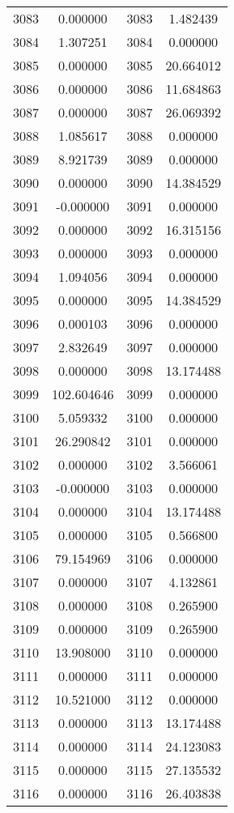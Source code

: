 \documentclass[12pt]{article}
\begin{document}
\begin{longtable}{@{}cccc@{}}
3083 & 0.000000 & 3083 & 1.482439 \\
3084 & 1.307251 & 3084 & 0.000000 \\
3085 & 0.000000 & 3085 & 20.664012 \\
3086 & 0.000000 & 3086 & 11.684863 \\
3087 & 0.000000 & 3087 & 26.069392 \\
3088 & 1.085617 & 3088 & 0.000000 \\
3089 & 8.921739 & 3089 & 0.000000 \\
3090 & 0.000000 & 3090 & 14.384529 \\
3091 & -0.000000 & 3091 & 0.000000 \\
3092 & 0.000000 & 3092 & 16.315156 \\
3093 & 0.000000 & 3093 & 0.000000 \\
3094 & 1.094056 & 3094 & 0.000000 \\
3095 & 0.000000 & 3095 & 14.384529 \\
3096 & 0.000103 & 3096 & 0.000000 \\
3097 & 2.832649 & 3097 & 0.000000 \\
3098 & 0.000000 & 3098 & 13.174488 \\
3099 & 102.604646 & 3099 & 0.000000 \\
3100 & 5.059332 & 3100 & 0.000000 \\
3101 & 26.290842 & 3101 & 0.000000 \\
3102 & 0.000000 & 3102 & 3.566061 \\
3103 & -0.000000 & 3103 & 0.000000 \\
3104 & 0.000000 & 3104 & 13.174488 \\
3105 & 0.000000 & 3105 & 0.566800 \\
3106 & 79.154969 & 3106 & 0.000000 \\
3107 & 0.000000 & 3107 & 4.132861 \\
3108 & 0.000000 & 3108 & 0.265900 \\
3109 & 0.000000 & 3109 & 0.265900 \\
3110 & 13.908000 & 3110 & 0.000000 \\
3111 & 0.000000 & 3111 & 0.000000 \\
3112 & 10.521000 & 3112 & 0.000000 \\
3113 & 0.000000 & 3113 & 13.174488 \\
3114 & 0.000000 & 3114 & 24.123083 \\
3115 & 0.000000 & 3115 & 27.135532 \\
3116 & 0.000000 & 3116 & 26.403838 \\

\end{longtable}
\end{document}
